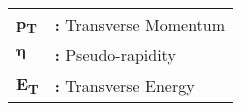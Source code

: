 \begin{tabular}{@{}p{2cm}l}
{\bf p\textsubscript{T}} & {\bf:} Transverse Momentum\\
{$\boldsymbol\eta$} & {\bf:} Pseudo-rapidity\\
{\bf E\textsubscript{T}} & {\bf:} Transverse Energy\\
\end{tabular}

